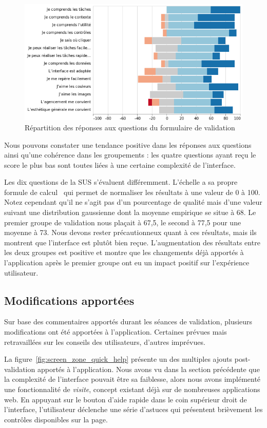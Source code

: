 \documentclass{EPL-master-thesis-covers-FR}
\begin{document}
				\begin{figure}[H]
					\includegraphics[width=\textwidth]{images/likert_questions}
					\caption{Répartition des réponses aux questions du formulaire de validation}
					\label{fig:validation_likert}
				\end{figure}

				Nous pouvons constater une tendance positive dans les réponses aux questions ainsi qu'une cohérence dans les groupements : les quatre questions ayant reçu le score le plus bas sont toutes liées à une certaine complexité de l'interface.

				Les dix questions de la SUS s'évaluent différemment. L'échelle a sa propre formule de calcul~\cite{ref:sus} qui permet de normaliser les résultats à une valeur de 0 à 100. Notez cependant qu'il ne s'agit pas d'un pourcentage de qualité mais d'une valeur suivant une distribution gaussienne dont la moyenne empirique se situe à 68. Le premier groupe de validation nous plaçait à 67,5, le second à 77,5 pour une moyenne à 73. Nous devons rester précautionneux quant à ces résultats, mais ils montrent que l'interface est plutôt bien reçue. L'augmentation des résultats entre les deux groupes est positive et montre que les changements déjà apportés à l'application après le premier groupe ont eu un impact positif sur l'expérience utilisateur.

			\subsection*{Modifications apportées}
				Sur base des commentaires apportés durant les séances de validation, plusieurs modifications ont été apportées à l'application. Certaines prévues mais retravaillées sur les conseils des utilisateurs, d'autres imprévues.

				La figure~\ref{fig:screen_zone_quick_help} présente un des multiples ajouts post-validation apportés à l'application. Nous avons vu dans la section précédente que la complexité de l'interface pouvait être sa faiblesse, alors nous avons implémenté une fonctionnalité de \emph{visite}, concept existant déjà sur de nombreuses applications web. En appuyant sur le bouton d'aide rapide dans le coin supérieur droit de l'interface, l'utilisateur déclenche une série d'astuces qui présentent brièvement les contrôles disponibles sur la page.
\end{document}
